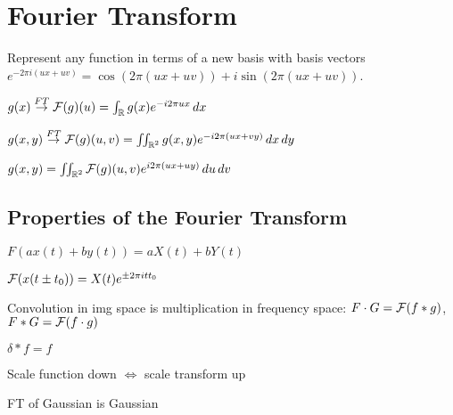 \section{Fourier Transform}
Represent any function in terms of a new basis with basis vectors \(e^{-2\pi i(ux + uv)} = \cos(2\pi(ux + uv)) + i \sin(2\pi(ux + uv))\).

\begin{definition}[1D-FT]
  \(g(x) \overset{FT}{\to} \operatorname{\mathcal{F}}(g)(u) = \int_{\operatorname{\mathbb{R}}} g(x) e^{-i2\pi ux} \, dx\)
\end{definition}

\begin{definition}[2D-FT]
  \(g(x, y) \overset{FT}{\to} \operatorname{\mathcal{F}}(g)(u, v) = \iint_{\operatorname{\mathbb{R}}^2} g(x, y) e^{-i2\pi (ux + vy)} \,dx \,dy\)
\end{definition}

\begin{definition}[Inverse FT]
  \(g(x, y) = \iint_{\operatorname{\mathbb{R}}^2} \operatorname{\mathcal{F}}(g)(u, v) e^{i2\pi(ux + uy)} \,du \,dv\)
\end{definition}

\subsection{Properties of the Fourier Transform}

\begin{definition}[Linearity]
  \(F(ax(t) + by(t)) = a X(t) + b Y(t)\)
\end{definition}

\begin{definition}
  \(\operatorname{\mathcal{F}}(x(t \pm t_0)) = X(t)e^{\pm 2 \pi i t t_0}\)
\end{definition}

\begin{algorithm}
  Convolution in img space is multiplication in frequency space: \(F \cdot G = \operatorname{\mathcal{F}}(f \ast g)\), \(F \ast G = \operatorname{\mathcal{F}}(f \cdot g)\)
\end{algorithm}

\begin{definition}
  \(\delta \ast f = f\)
\end{definition}

\begin{definition}
  Scale function down \(\iff\) scale transform up
\end{definition}

\begin{definition}[Gaussian]
  FT of Gaussian is Gaussian
\end{definition}

